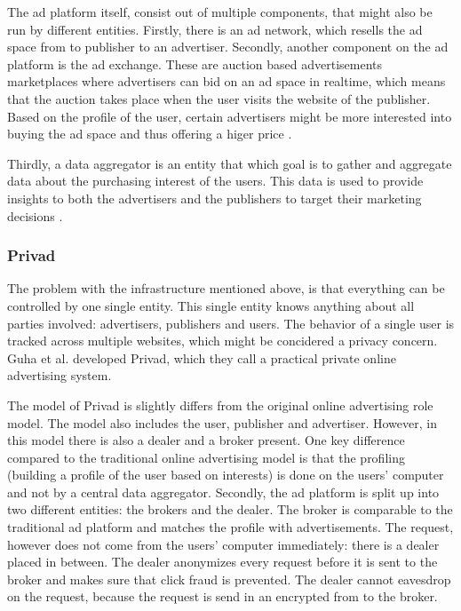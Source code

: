 The ad platform itself, consist out of multiple components, that might also be run by different entities. Firstly, there is an ad network, which resells the ad space from to publisher to an advertiser. Secondly, another component on the ad platform is the ad exchange. These are auction based advertisements marketplaces where advertisers can bid on an ad space in realtime, which means that the auction takes place when the user visits the website of the publisher. Based on the profile of the user, certain advertisers might be more interested into buying the ad space and thus offering a higer price \cite{estrada2017online}. 

Thirdly, a data aggregator is an entity that which goal is to gather and aggregate data about the purchasing interest of the users. This data is used to provide insights to both the advertisers and the publishers to target their marketing decisions \cite{estrada2017online}.

\subsubsection{Privad}
The problem with the infrastructure mentioned above, is that everything can be controlled by one single entity. This single entity knows anything about all parties involved: advertisers, publishers and users. The behavior of a single user is tracked across multiple websites, which might be concidered a privacy concern. Guha et al. \cite{guha2011privad} developed Privad, which they call a practical private online advertising system. 

The model of Privad is slightly differs from the original online advertising role model. The model also includes the user, publisher and advertiser. However, in this model there is also a dealer and a broker present. One key difference compared to the traditional online advertising model is that the profiling (building a profile of the user based on interests) is done on the users' computer and not by a central data aggregator. Secondly, the ad platform is split up into two different entities: the brokers and the dealer. The broker is comparable to the traditional ad platform and matches the profile with advertisements. The request, however does not come from the users' computer immediately: there is a dealer placed in between. The dealer anonymizes every request before it is sent to the broker and makes sure that click fraud is prevented. The dealer cannot eavesdrop on the request, because the request is send in an encrypted from to the broker. 


